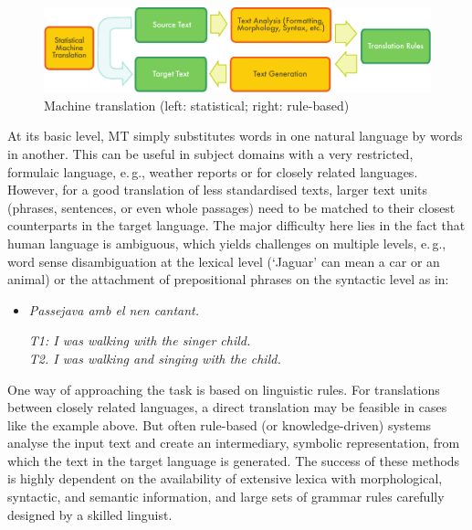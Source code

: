 \begin{multicols}{2}

\begin{figure}[htb]
  \center
  \includegraphics[width=\textwidth]{../_media/english/machine_translation}
  \caption{Machine translation (left: statistical; right: rule-based)}
  \label{fig:mtarch_en}
\end{figure}

At its basic level, MT simply substitutes words in one natural language by words in another. This can be useful in subject domains with a very restricted, formulaic language, e.\,g., weather reports or for closely related languages. However, for a good translation of less standardised texts, larger text units (phrases, sentences, or even whole passages) need to be matched to their closest counterparts in the target language. The major difficulty here lies in the fact that human language is ambiguous, which yields challenges on multiple levels, e.\,g., word sense disambiguation at the lexical level (‘Jaguar’ can mean a car or an animal) or the attachment of prepositional phrases on the syntactic level as in:

\begin{itemize}
\item[] \textit{Passejava amb el nen cantant.}

\textit{T1: I was walking with the singer child.}\\
\textit{T2. I was walking and singing with the child.}
\end{itemize}

One way of approaching the task is based on linguistic rules. For translations between closely related languages, a direct translation may be feasible in cases like the example above. But often rule-based (or knowledge-driven) systems analyse the input text and create an intermediary, symbolic representation, from which the text in the target language is generated. The success of these methods is highly dependent on the availability of extensive lexica with morphological, syntactic, and semantic information, and large sets of grammar rules carefully designed by a skilled linguist.


\end{multicols}
